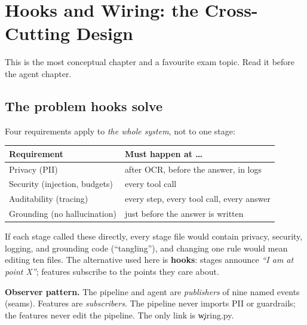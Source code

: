 \chapter{Hooks and Wiring: the Cross-Cutting Design}\label{ch:hooks}
This is the most conceptual chapter and a favourite exam topic. Read it before the agent chapter.

\section{The problem hooks solve}
Four requirements apply to \emph{the whole system}, not to one stage:
\begin{center}\begin{tabular}{@{}ll@{}}\toprule Requirement & Must happen at \dots \\ \midrule
Privacy (PII) & after OCR, before the answer, in logs \\
Security (injection, budgets) & every tool call \\
Auditability (tracing) & every step, every tool call, every answer \\
Grounding (no hallucination) & just before the answer is written \\ \bottomrule\end{tabular}\end{center}
If each stage called these directly, every stage file would contain privacy, security, logging, and grounding code (``tangling''), and changing one rule would mean editing ten files. The alternative used here is \textbf{hooks}: stages announce \emph{``I am at point X''}; features subscribe to the points they care about.

\begin{keyidea}
\textbf{Observer pattern.} The pipeline and agent are \emph{publishers} of nine named events (seams). Features are \emph{subscribers}. The pipeline never imports PII or guardrails; the features never edit the pipeline. The only link is \c{wiring.py}.
\end{keyidea}


